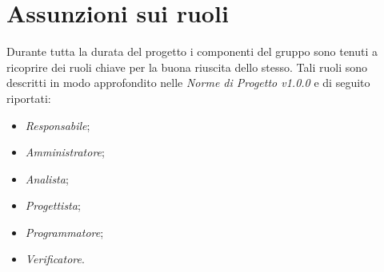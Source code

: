 \section{Assunzioni sui ruoli}
	Durante tutta la durata del progetto i componenti del gruppo sono tenuti a ricoprire dei ruoli chiave per la buona riuscita dello stesso.
	Tali ruoli sono descritti in modo approfondito nelle \textit{Norme di Progetto v1.0.0} e di seguito riportati:
	\begin{itemize}
		\item \textit{Responsabile};
		\item \textit{Amministratore};
		\item \textit{Analista};
		\item \textit{Progettista};
		\item \textit{Programmatore};
		\item \textit{Verificatore}.
	\end{itemize}
	\begin{comment}
		
	Ciascun ruolo ha un diverso costo. Di seguito verrà riportato, per ogni ruolo, il suo costo orario:

		\begin{tabularx}{\textwidth}{|c|c|}
			\hline
			\textbf{Ruolo} & \textbf{Costo} \\
			\hline
			Responsabile & 30 \euro \\
			Amministratore & 20 \euro \\
			Analista & 25 \euro \\
			Progettista & 22 \euro \\
			Programmatore & 15 \euro \\
			Verificatore & 15 \euro \\
			\hline
			\caption{Costi per ruolo}
		\end{tabularx}

	\end{comment}